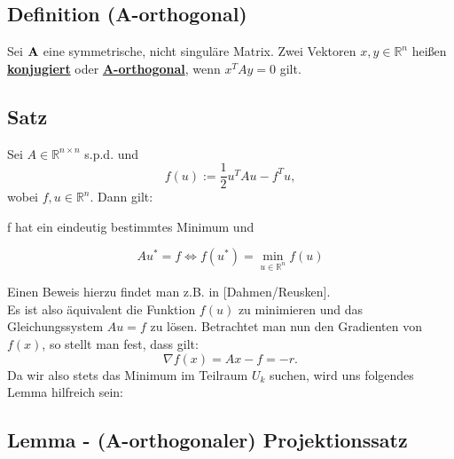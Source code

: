 \subsection{Definition (A-orthogonal)}\label{ss.A-orthogonal}
Sei ${\textbf{A}}$ eine symmetrische, nicht singuläre Matrix. Zwei Vektoren $x,y \in \mathbb{R}^{n}$ heißen \underline{\textbf{konjugiert}} oder \underline{\textbf{A-orthogonal}}, wenn $x^{T}Ay = 0$ gilt.

\subsection{Satz}
Sei $A\in\mathbb{R}^{n \times n}$ s.p.d. und
\begin{equation}
f(u) := \frac {1} {2} u^{T}Au - f^{T}u,
\end{equation}
wobei $f,u \in \mathbb{R}^{n}$. Dann gilt:
\begin{center}
f hat ein eindeutig bestimmtes Minimum und
\end{center}
\begin{equation}
Au^{*} = f \Longleftrightarrow f(u^{*}) = \underset{u\in\mathbb{R}^{n}}{\min} f(u)
\end{equation}

Einen Beweis hierzu findet man z.B. in [Dahmen/Reusken].\\
Es ist also äquivalent die Funktion $f(u)$ zu minimieren und das Gleichungssystem $Au = f$ zu lösen. Betrachtet man nun den Gradienten von $f(x)$, so stellt man fest, dass gilt:
\begin{equation}
\nabla f(x) = Ax - f = -r.
\end{equation}
Da wir also stets das Minimum im Teilraum $U_{k}$ suchen, wird uns folgendes Lemma hilfreich sein:


\subsection{Lemma - (A-orthogonaler) Projektionssatz}\label{s.Projektionssatz}

